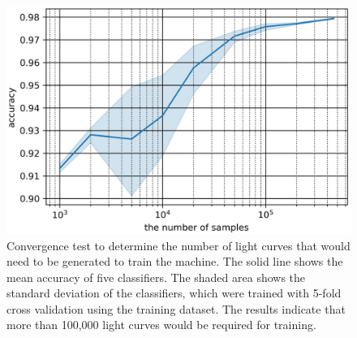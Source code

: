 \documentclass[proof]{pasj01}
\begin{document}
%
%
\begin{figure}[htbp]
  \begin{center}
     \includegraphics[width=\columnwidth]{figures/size_accuracy.eps}
  \end{center}
  \caption{%
Convergence test to determine the number of light curves that would need to be generated to train the machine. 
The solid line shows the mean accuracy of five classifiers. The shaded area shows the standard deviation of the classifiers, which were trained with 5-fold cross validation using the training dataset. The results indicate that more than 100,000 light curves would be required for training.
  }%
  \label{fig:size_convergence_test}
\end{figure}
%

%
\end{document}

